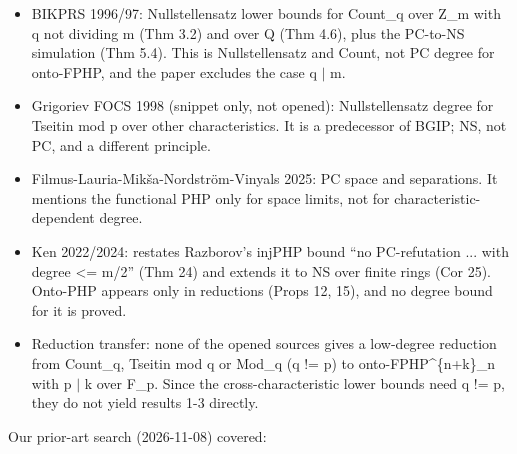 \documentclass{article}
\begin{document}
\begin{itemize}
\item BIKPRS 1996/97: Nullstellensatz lower bounds for Count\_q over Z\_m with q not dividing m (Thm 3.2) and over Q (Thm 4.6), plus the PC-to-NS simulation (Thm 5.4). This is Nullstellensatz and Count, not PC degree for onto-FPHP, and the paper excludes the case q $\mid$ m.
\item Grigoriev FOCS 1998 (snippet only, not opened): Nullstellensatz degree for Tseitin mod p over other characteristics. It is a predecessor of BGIP; NS, not PC, and a different principle.
\item Filmus-Lauria-Mikša-Nordström-Vinyals 2025: PC space and separations. It mentions the functional PHP only for space limits, not for characteristic-dependent degree.
\item Ken 2022/2024: restates Razborov's injPHP bound ``no PC-refutation ... with degree \textless{}= m/2'' (Thm 24) and extends it to NS over finite rings (Cor 25). Onto-PHP appears only in reductions (Props 12, 15), and no degree bound for it is proved.
\item Reduction transfer: none of the opened sources gives a low-degree reduction from Count\_q, Tseitin mod q or Mod\_q (q != p) to onto-FPHP\textasciicircum{}\{n+k\}\_n with p $\mid$ k over F\_p. Since the cross-characteristic lower bounds need q != p, they do not yield results 1-3 directly.
\end{itemize}

Our prior-art search (2026-11-08) covered:
\end{document}
